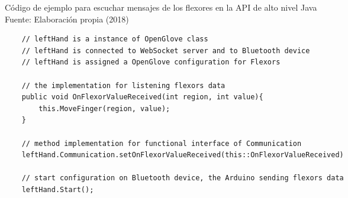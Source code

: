 \begin{algorithm}[!ht]
  \begin{center} 
   	\captionsetup{justification=centering}
    \caption[Código de ejemplo para escuchar mensajes de los flexores en la API de alto nivel Java]{Código de ejemplo para escuchar mensajes de los flexores en la API de alto nivel Java\\ \tab[4cm] Fuente: Elaboración propia (2018)}
    \label{code:api-chsharp}
  \end{center}
  \begin{lstlisting}
	// leftHand is a instance of OpenGlove class
	// leftHand is connected to WebSocket server and to Bluetooth device
	// leftHand is assigned a OpenGlove configuration for Flexors
	
	// the implementation for listening flexors data
	public void OnFlexorValueReceived(int region, int value){
		this.MoveFinger(region, value);
	}
		
	// method implementation for functional interface of Communication
	leftHand.Communication.setOnFlexorValueReceived(this::OnFlexorValueReceived)
	
	// start configuration on Bluetooth device, the Arduino sending flexors data
	leftHand.Start();
  \end{lstlisting}
\end{algorithm}


    